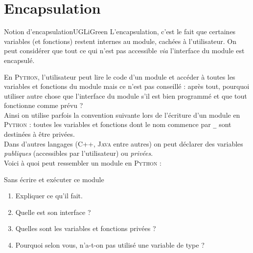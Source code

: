 \documentclass[a4paper,12pt,french]{book}
\begin{document}
\section{Encapsulation}


\begin{encadrecolore}{Notion d'encapsulation}{UGLiGreen}
L'encapsulation, c'est le fait que certaines variables (et fonctions) restent internes au module, cachées à l'utilisateur. On peut considérer que tout ce qui n'est pas accessible \textit{via} l'interface du module est encapsulé.
\end{encadrecolore}
En \textsc{Python}, l'utilisateur peut lire le code d'un module et accéder à toutes les variables et fonctions du module mais ce n'est pas conseillé : après tout, pourquoi utiliser autre chose que l'interface du module s'il est bien programmé et que tout fonctionne comme prévu ?\\
Ainsi on utilise parfois la convention suivante lors de l'écriture d'un module en \textsc{Python} : toutes les variables et fonctions dont le nom commence par \og \texttt{\_}\fg{} sont destinées à être privées.\\
Dans d'autres langages (\textsc{C++}, \textsc{Java} entre autres) on peut déclarer des variables \textit{publiques} (accessibles par l'utilisateur) ou \textit{privées}.\\

Voici à quoi peut ressembler un module en \textsc{Python} :


\begin{exercice}[]
Sans écrire et exécuter ce module
\begin{enumerate}[\bfseries 1.]
	\item 	Expliquer ce qu'il fait.
	\item 	Quelle est son interface ?
	\item 	Quelles sont les variables et fonctions privées ?
	\item 	Pourquoi selon vous, n'a-t-on pas utilisé une variable  de type  ?
\end{enumerate}
\end{exercice}
\end{document}
